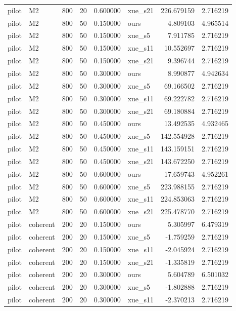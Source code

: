 \begin{longtable}{llrrrlrr}
pilot & M2 & 800 & 20 & 0.600000 & xue\_s21 & 226.679159 & 2.716219 \\
pilot & M2 & 800 & 50 & 0.150000 & ours & 4.809103 & 4.965514 \\
pilot & M2 & 800 & 50 & 0.150000 & xue\_s5 & 7.911785 & 2.716219 \\
pilot & M2 & 800 & 50 & 0.150000 & xue\_s11 & 10.552697 & 2.716219 \\
pilot & M2 & 800 & 50 & 0.150000 & xue\_s21 & 9.396744 & 2.716219 \\
pilot & M2 & 800 & 50 & 0.300000 & ours & 8.990877 & 4.942634 \\
pilot & M2 & 800 & 50 & 0.300000 & xue\_s5 & 69.166502 & 2.716219 \\
pilot & M2 & 800 & 50 & 0.300000 & xue\_s11 & 69.222782 & 2.716219 \\
pilot & M2 & 800 & 50 & 0.300000 & xue\_s21 & 69.180884 & 2.716219 \\
pilot & M2 & 800 & 50 & 0.450000 & ours & 13.492535 & 4.932465 \\
pilot & M2 & 800 & 50 & 0.450000 & xue\_s5 & 142.554928 & 2.716219 \\
pilot & M2 & 800 & 50 & 0.450000 & xue\_s11 & 143.159151 & 2.716219 \\
pilot & M2 & 800 & 50 & 0.450000 & xue\_s21 & 143.672250 & 2.716219 \\
pilot & M2 & 800 & 50 & 0.600000 & ours & 17.659743 & 4.952261 \\
pilot & M2 & 800 & 50 & 0.600000 & xue\_s5 & 223.988155 & 2.716219 \\
pilot & M2 & 800 & 50 & 0.600000 & xue\_s11 & 224.853063 & 2.716219 \\
pilot & M2 & 800 & 50 & 0.600000 & xue\_s21 & 225.478770 & 2.716219 \\
pilot & coherent & 200 & 20 & 0.150000 & ours & 5.305997 & 6.479319 \\
pilot & coherent & 200 & 20 & 0.150000 & xue\_s5 & -1.759259 & 2.716219 \\
pilot & coherent & 200 & 20 & 0.150000 & xue\_s11 & -2.045924 & 2.716219 \\
pilot & coherent & 200 & 20 & 0.150000 & xue\_s21 & -1.335819 & 2.716219 \\
pilot & coherent & 200 & 20 & 0.300000 & ours & 5.604789 & 6.501032 \\
pilot & coherent & 200 & 20 & 0.300000 & xue\_s5 & -1.802888 & 2.716219 \\
pilot & coherent & 200 & 20 & 0.300000 & xue\_s11 & -2.370213 & 2.716219 \\

\end{longtable}
